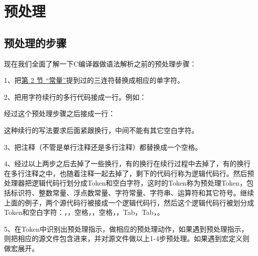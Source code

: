 

\chapter{预处理}
%





\section{预处理的步骤}
%
现在我们全面了解一下C编译器做语法解析之前的预处理步骤：



1、把\hyperlink{db.ch02s02.id2707837}{第 2 节 “常量”}提到过的三连符替换成相应的单字符。



2、把用\BookCode{\textbackslash{}}字符续行的多行代码接成一行。例如：




经过这个预处理步骤之后接成一行：




这种续行的写法要求\BookCode{\textbackslash{}}后面紧跟换行，中间不能有其它空白字符。



3、把注释（不管是单行注释还是多行注释）都替换成一个空格。



4、经过以上两步之后去掉了一些换行，有的换行在续行过程中去掉了，有的换行在多行注释之中，也随着注释一起去掉了，剩下的代码行称为逻辑代码行。然后预处理器把逻辑代码行划分成Token和空白字符，这时的Token称为预处理Token，包括标识符、整数常量、浮点数常量、字符常量、字符串、运算符和其它符号。继续上面的例子，两个源代码行被接成一个逻辑代码行，然后这个逻辑代码行被划分成Token和空白字符：\BookCode{\#}，，空格，，空格，，Tab，Tab，。



5、在Token中识别出预处理指示，做相应的预处理动作，如果遇到预处理指示，则把相应的源文件包含进来，并对源文件做以上1-4步预处理。如果遇到宏定义则做宏展开。



